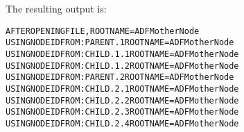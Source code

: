 \noindent
The resulting output is:

\begin{alltt}
    AFTER OPENING FILE, ROOT NAME = ADF MotherNode
   USING NODE ID FROM: PARENT.1          ROOT NAME = ADF MotherNode
   USING NODE ID FROM: CHILD.1.1         ROOT NAME = ADF MotherNode
   USING NODE ID FROM: CHILD.1.2         ROOT NAME = ADF MotherNode
   USING NODE ID FROM: PARENT.2          ROOT NAME = ADF MotherNode
   USING NODE ID FROM: CHILD.2.1         ROOT NAME = ADF MotherNode
   USING NODE ID FROM: CHILD.2.2         ROOT NAME = ADF MotherNode
   USING NODE ID FROM: CHILD.2.3         ROOT NAME = ADF MotherNode
   USING NODE ID FROM: CHILD.2.4         ROOT NAME = ADF MotherNode
\end{alltt}
